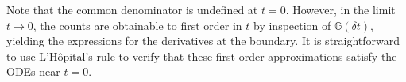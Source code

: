 \documentclass{article}
\begin{document}
Note that the common denominator is undefined at $t=0$.
However, in the limit $t \to 0$, the counts are obtainable to first order in $t$ by inspection of $\mathbb{G}(\delta t)$,
yielding the expressions for the derivatives at the boundary.
It is straightforward to use L'H\^{o}pital's rule to verify that these first-order approximations satisfy the ODEs near $t=0$.
%

\end{document}
